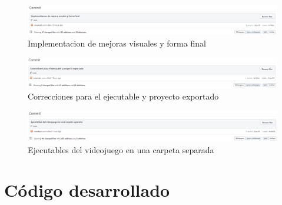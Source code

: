 \documentclass{article}
\begin{document}
\begin{figure}[H]
	\centering
	\includegraphics[width=1\textwidth,keepaspectratio]{img/commit_30.png}
	\caption{Implementacion de mejoras visuales y forma final}
\end{figure}
\begin{figure}[H]
	\centering
	\includegraphics[width=1\textwidth,keepaspectratio]{img/commit_31.png}
	\caption{Correcciones para el ejecutable y proyecto exportado}
\end{figure}
\begin{figure}[H]
	\centering
	\includegraphics[width=1\textwidth,keepaspectratio]{img/commit_32.png}
	\caption{Ejecutables del videojuego en una carpeta separada}
\end{figure}
\pagebreak

\section{Código desarrollado}
\end{document}
